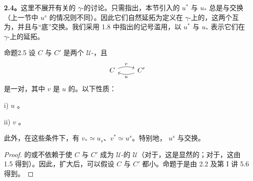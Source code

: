 \textbf{2.4。}这里不展开有关的 $\gamma$-的讨论。只需指出，本节引入的 $u^*$ 与 $u_*$ 总是与交换（上一节中 $u^s$ 的情况则不同）。因此它们自然延拓为定义在 $\gamma$-上的，这两个互为，并且与“底”交换。我们采用 1.8 中指出的记号滥用，以 $u^*$ 与 $u_*$ 表示它们在 $\gamma$-上的延拓。

\begin{SGAresult}{命题}{2.5}
设 $C$ 与 $C'$ 是两个 $\mathcal U$-，且
\[
 \begin{tikzcd}C\arrow[r,bend left=20,"v"]&C'\arrow[l,bend left=20,"u"]\end{tikzcd}
\]
是一对，其中 $v$ 是 $u$ 的。以下性质：

\noindent i)  $u$ 。

\noindent ii)  $v$ 。

此外，在这些条件下，有 $v_*\simeq u_s$、$v^*\simeq u^s$。特别地， $u^s$ 与交换。
\end{SGAresult}
\begin{proof}
的或不依赖于使 $C$ 与 $C'$ 成为 $\mathcal U$-的 $\mathcal U$（对于，这是显然的；对于，这由 1.5 得到）。因此，扩大后，可以假设 $C$ 与 $C'$ 都小。命题于是由 2.2 及第 I 讲 5.6 得到。
\end{proof}

